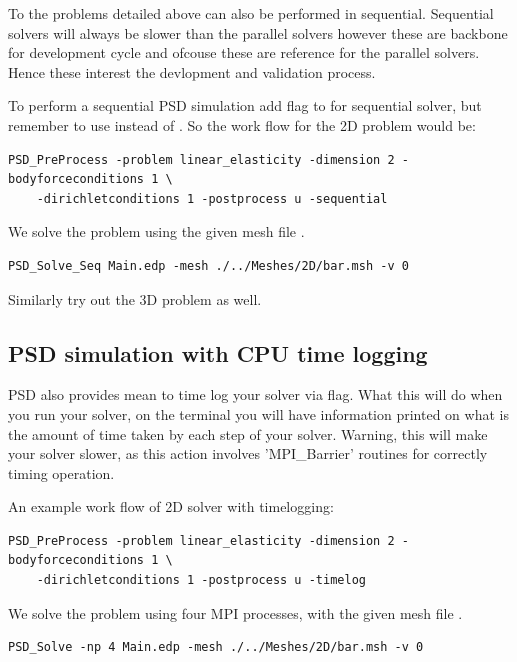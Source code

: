 {{To the problems detailed above can also be performed in sequential. Sequential solvers will always be slower than the parallel solvers however these are backbone for development cycle and ofcouse these are reference for the parallel solvers. Hence these interest the devlopment and validation process.

To perform a sequential PSD simulation add  flag to  for sequential solver, but remember to use  instead of . So the work flow for the 2D problem would be:

\begin{lstlisting}[style=BashInputStyle]
	PSD_PreProcess -problem linear_elasticity -dimension 2 -bodyforceconditions 1 \
	-dirichletconditions 1 -postprocess u -sequential
\end{lstlisting}

We solve the problem using the given mesh file . 

\begin{lstlisting}[style=BashInputStyle]
	PSD_Solve_Seq Main.edp -mesh ./../Meshes/2D/bar.msh -v 0
\end{lstlisting}

Similarly try out the 3D problem as well.

\subsection{PSD  simulation with CPU time logging \label{sec:cpu}}

PSD also provides mean to time log your solver via  flag. What this will do when you run your solver, on the terminal you will have information printed on what is the amount of time taken by each step of your solver. Warning, this will make your solver slower, as this action involves 'MPI\_Barrier' routines for correctly timing operation. 

An example work flow of 2D solver with timelogging:

\begin{lstlisting}[style=BashInputStyle]
	PSD_PreProcess -problem linear_elasticity -dimension 2 -bodyforceconditions 1 \
	-dirichletconditions 1 -postprocess u -timelog
\end{lstlisting}

We solve the problem using four MPI processes, with the given mesh file . 

\begin{lstlisting}[style=BashInputStyle]
	PSD_Solve -np 4 Main.edp -mesh ./../Meshes/2D/bar.msh -v 0
\end{lstlisting}


}}
